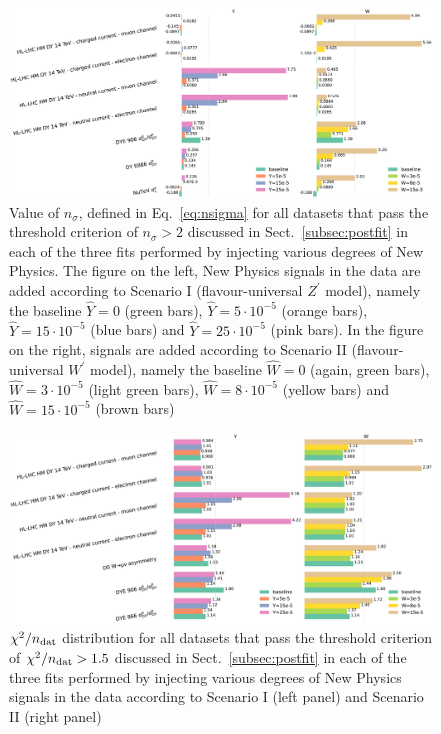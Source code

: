 \documentclass[withindex,glossary]{cam-thesis}
\begin{document}
%
\begin{figure}[H]

  \includegraphics[width=0.98\linewidth]{Figures/plot_nsigma_multi.pdf}
  \caption{
    \label{fig:nsigma_multi}
  Value of $n_{\sigma}$, defined in Eq.~\eqref{eq:nsigma}
    for all datasets that pass the threshold criterion of
    $n_{\sigma}>2$ discussed in Sect.~\ref{subsec:postfit} in each of the
    three fits performed by injecting various degrees of New Physics.
    The figure on the left, New Physics signals in the data are added
    according to Scenario I (flavour-universal $Z^{'}$ model), namely the baseline $\hat{Y}=0$ (green bars),
    $\hat{Y}=5\cdot 10^{-5}$ (orange bars), $\hat{Y}=15\cdot 10^{-5}$
    (blue bars) and $\hat{Y}=25\cdot 10^{-5}$ (pink bars).
    In the figure on the right, signals are added according to Scenario II
    (flavour-universal $W^{'}$ model), namely the baseline $\hat{W}=0$ (again, green
    bars), $\hat{W}=3\cdot 10^{-5}$ (light green bars), $\hat{W}=8\cdot 10^{-5}$
    (yellow bars) and $\hat{W}=15\cdot 10^{-5}$ (brown bars)}
\label{fig:Ynsigma}
\end{figure}


\begin{figure}[H]
  
  \includegraphics[width=0.90\linewidth]{Figures/plot_chi2_multi.pdf}
  \caption{
  \label{fig:chi2_multi}
  $\chi^2/n_{\rm dat}$ distribution  for all datasets that pass the threshold criterion of
    $\chi^2/n_{\rm dat}>1.5$ discussed in Sect.~\ref{subsec:postfit} in each of the
    three fits performed by injecting various degrees of New Physics
    signals in the data according to Scenario I (left panel) and
    Scenario II (right panel)  }
\end{figure}
\end{document}
